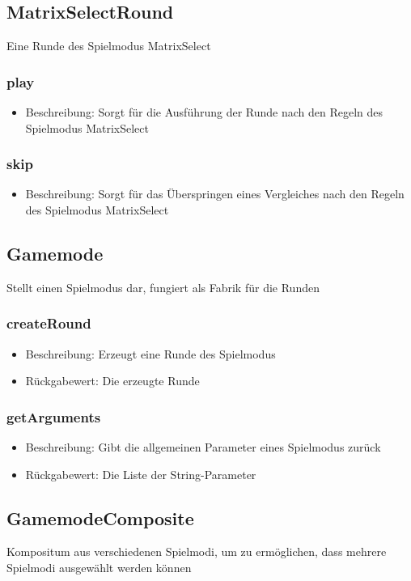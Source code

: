 \documentclass[a4paper]{scrreprt}
\begin{document}
   \subsection{MatrixSelectRound}
   Eine Runde des Spielmodus MatrixSelect
   \subsubsection{play}
      \begin{itemize}
      \item Beschreibung: Sorgt für die Ausführung der Runde nach den Regeln des Spielmodus MatrixSelect
      \end{itemize}
   \subsubsection{skip}
      \begin{itemize}
      \item Beschreibung: Sorgt für das Überspringen eines Vergleiches nach den Regeln des Spielmodus MatrixSelect
      \end{itemize}
   
   \subsection{Gamemode}
   Stellt einen Spielmodus dar, fungiert als Fabrik für die Runden
   \subsubsection{createRound}
   \begin{itemize}
   \item Beschreibung: Erzeugt eine Runde des Spielmodus
   \item Rückgabewert: Die erzeugte Runde
   \end{itemize}
   \subsubsection{getArguments}
      \begin{itemize}
      \item Beschreibung: Gibt die allgemeinen Parameter eines Spielmodus zurück
      \item Rückgabewert: Die Liste der String-Parameter %
      \end{itemize}
   
   \subsection{GamemodeComposite}
   Kompositum aus verschiedenen Spielmodi, um zu ermöglichen, dass mehrere Spielmodi ausgewählt werden können
\end{document}

